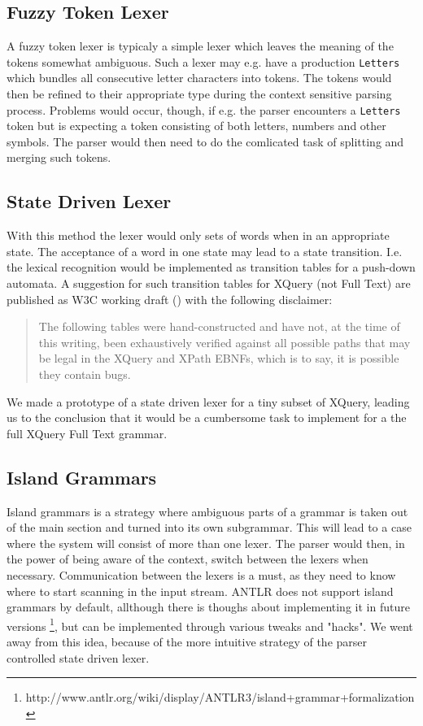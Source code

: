 \subsection{Fuzzy Token Lexer}
A fuzzy token lexer is typicaly a simple lexer which leaves the meaning of the tokens somewhat ambiguous. Such a lexer may e.g. have a production \verb!Letters! which bundles all consecutive letter characters into tokens. The tokens would then be refined to their appropriate type during the context sensitive parsing process. Problems would occur, though, if e.g. the parser encounters a \verb!Letters! token but is expecting a token consisting of both letters, numbers and other symbols. The parser would then need to do the comlicated task of splitting and merging such tokens.

\subsection{State Driven Lexer}
With this method the lexer would only sets of words when in an appropriate state. The acceptance of a word in one state may lead to a state transition. I.e. the lexical recognition would be implemented as transition tables for a push-down automata. A suggestion for such transition tables for XQuery (not Full Text) are published as W3C working draft (\cite{createTokenizer}) with the following disclaimer:
\begin{quote}
The following tables were hand-constructed and have not, at the time of this writing, been exhaustively verified against all possible paths that may be legal in the XQuery and XPath EBNFs, which is to say, it is possible they contain bugs.
\end{quote}
We made a prototype of a state driven lexer for a tiny subset of XQuery, leading us to the conclusion that it would be a cumbersome task to implement for a the full XQuery Full Text grammar.

\subsection{Island Grammars}
Island grammars is a strategy where ambiguous parts of a grammar is taken out of the main section and turned into its own subgrammar. This will lead to a case where the system will consist of more than one lexer. The parser would then, in the power of being aware of the context, switch between the lexers when necessary. Communication between the lexers is a must, as they need to know where to start scanning in the input stream. ANTLR does not support island grammars by default, allthough there is thoughs about implementing it in future versions \footnote{http://www.antlr.org/wiki/display/ANTLR3/island+grammar+formalization}, but can be implemented through various tweaks and "hacks". We went away from this idea, because of the more intuitive strategy of the parser controlled state driven lexer.

